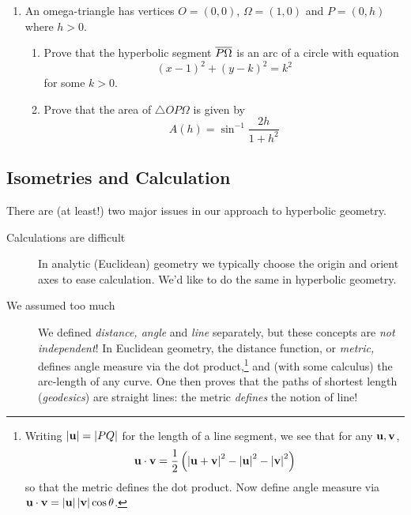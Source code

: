 \begin{exercises}
\begin{enumerate}
  \item An omega-triangle has vertices $O=(0,0)$, $\Omega=(1,0)$ and $P=(0,h)$ where $h>0$.
  \begin{enumerate}
    \item Prove that the hyperbolic segment $\overline{P\Omega}$ is an arc of a circle with equation
    \[(x-1)^2+(y-k)^2=k^2\]
    for some $k>0$.
    \item Prove that the area of $\triangle OP\Omega$ is given by
		\[A(h)=\sin^{-1}\dfrac{2h}{1+h^2}\]
	\end{enumerate}

\end{enumerate}
\end{exercises}

\clearpage




\subsection{Isometries and Calculation}\label{sec:hyperiso}

There are (at least!) two major issues in our approach to hyperbolic geometry.

\begin{description}
	\item[Calculations are difficult] In analytic (Euclidean) geometry we typically choose the origin and orient axes to ease calculation. We'd like to do the same in hyperbolic geometry.
	\item[We assumed too much] We defined \emph{distance, angle} and \emph{line} separately, but these concepts are \emph{not independent}! In Euclidean geometry, the distance function, or \emph{metric,} defines angle measure via the dot product,\footnote{Writing $\left| {\mathbf{u}}\right|=\left| PQ\right|$ for the length of a line segment, we see that for any ${\mathbf{u}},{\mathbf{v}}$,
\[{\mathbf{u}}\cdot{\mathbf{v}}=\frac 12\left(\left| {\mathbf{u}}+{\mathbf{v}}\right|^2-\left| {\mathbf{u}}\right|^2-\left| {\mathbf{v}}\right|^2\right)\]
so that the metric defines the dot product. Now define angle measure via ${\mathbf{u}}\cdot{\mathbf{v}}=\left| {\mathbf{u}}\right|\left| {\mathbf{v}}\right|\cos\theta$.} and (with some calculus) the arc-length of any curve. One then  proves that the paths of shortest length (\emph{geodesics}) are straight lines: the metric \emph{defines} the notion of line!
\end{description}


